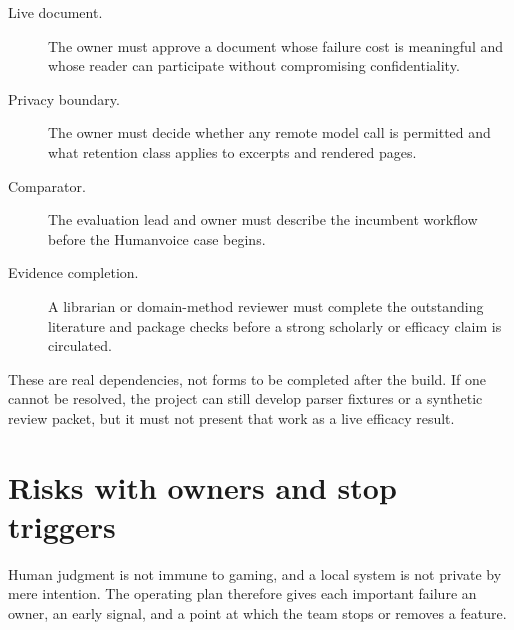 \begin{description}
\item[Live document.] The owner must approve a document whose failure cost is
  meaningful and whose reader can participate without compromising
  confidentiality.
\item[Privacy boundary.] The owner must decide whether any remote model call is
  permitted and what retention class applies to excerpts and rendered pages.
\item[Comparator.] The evaluation lead and owner must describe the incumbent
  workflow before the Humanvoice case begins.
\item[Evidence completion.] A librarian or domain-method reviewer must complete
  the outstanding literature and package checks before a strong scholarly or
  efficacy claim is circulated.
\end{description}

These are real dependencies, not forms to be completed after the build. If one
cannot be resolved, the project can still develop parser fixtures or a
synthetic review packet, but it must not present that work as a live efficacy
result.

\section{Risks with owners and stop triggers}

Human judgment is not immune to gaming, and a local system is not private by
mere intention. The operating plan therefore gives each important failure an
owner, an early signal, and a point at which the team stops or removes a
feature.

